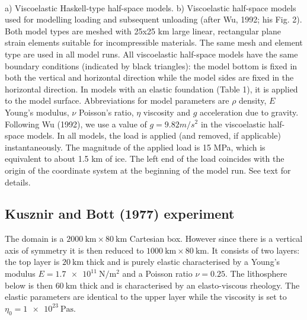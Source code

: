 \begin{center}
\\
{\captionfont 
a) Viscoelastic Haskell-type half-space models. b) Viscoelastic  half-space models used for modelling loading and subsequent
unloading (after Wu, 1992; his Fig. 2). Both model types are meshed with 25x25 km large linear, rectangular plane strain elements suitable for incompressible materials. 
The same mesh and element type are used in all model runs. All viscoelastic half-space models have the same boundary conditions (indicated by black triangles): the model bottom is fixed in both the vertical and horizontal direction while the model sides are fixed in the horizontal direction. In models with an elastic foundation (Table 1), it is applied to the model surface. Abbreviations for model parameters are $\rho$ density, $E$ Young's modulus, $\nu$ Poisson's ratio, $\eta$ viscosity and $g$ acceleration due to gravity. Following Wu (1992), we use a value of $g = 9.82 m/s^2$ in the viscoelastic
half-space models. 
In all models, the load is applied (and removed, if applicable) instantaneously. The magnitude of the applied load is 15 MPa, which is equivalent to about 1.5 km of ice. The left end of
the load coincides with the origin of the coordinate system at the beginning of the model run. See text for details.
}
\end{center}


\subsection{Kusznir and Bott (1977) experiment}

The domain is a $\SI{2000}{\km}\times\SI{80}{\km}$ Cartesian box. 
However since there is a vertical axis of symmetry it is then reduced to 
$\SI{1000}{\km}\times\SI{80}{\km}$.
It consists of two layers: the top layer is $\SI{20}{\km}$ thick and is 
purely elastic characterised by a Young's modulus $E=\SI{1.7e11}{\newton\per\square\meter}$ and a Poisson ratio $\nu=0.25$.
The lithosphere below is then $\SI{60}{\km}$ thick and is characterised by an elasto-viscous rheology. The elastic parameters are identical to the upper layer while the viscosity is set to $\eta_0=\SI{1e23}{\pascal\second}$.

